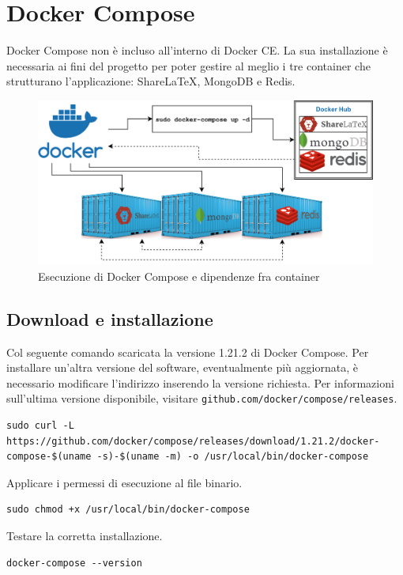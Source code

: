 \section{Docker Compose}
Docker Compose non è incluso all'interno di Docker CE. La sua installazione è necessaria ai fini del progetto per poter gestire al meglio i tre container che strutturano l'applicazione: ShareLaTeX, MongoDB e Redis.
\begin{figure}[h]
    \centering
    \includegraphics[scale=0.1]{immagini/docker_container_dependencies.png}
    \caption{Esecuzione di Docker Compose e dipendenze fra container}
    \label{fig:docker_compose_dipendenze}
\end{figure}

\subsection{Download e installazione}
Col seguente comando scaricata la versione 1.21.2 di Docker Compose. Per installare un'altra versione del software, eventualmente più aggiornata, è necessario modificare l'indirizzo inserendo la versione richiesta. Per informazioni sull'ultima versione disponibile, visitare \verb|github.com/docker/compose/releases|.
\begin{lstlisting}
sudo curl -L https://github.com/docker/compose/releases/download/1.21.2/docker-compose-$(uname -s)-$(uname -m) -o /usr/local/bin/docker-compose
\end{lstlisting}
Applicare i permessi di esecuzione al file binario.
\begin{lstlisting}
sudo chmod +x /usr/local/bin/docker-compose
\end{lstlisting}
Testare la corretta installazione.
\begin{lstlisting}
docker-compose --version
\end{lstlisting}

